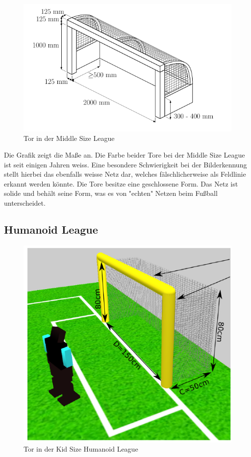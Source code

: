 \documentclass[a4paper,12pt]{article}
\begin{document}
\begin{figure}[H]
\includegraphics{middlesize-goal.png}
\caption{Tor in der Middle Size League}
\label{fig:goal-msl}
\end{figure}

Die Grafik zeigt die Maße an. Die Farbe beider Tore bei der Middle Size League ist seit einigen
Jahren weiss. Eine besondere Schwierigkeit bei der Bilderkennung stellt hierbei das ebenfalls
weisse Netz dar, welches
fälschlicherweise als Feldlinie erkannt werden könnte. Die Tore besitze eine geschlossene Form. Das
Netz ist solide und behält seine Form, was es von "echten" Netzen beim Fußball unterscheidet.


\subsection{Humanoid League}
\begin{figure}[H]
\includegraphics{humanoid-kidsize-goal.png}
\caption{Tor in der Kid Size Humanoid League}
\label{fig:goal-human-kid}
\end{figure}
\end{document}
